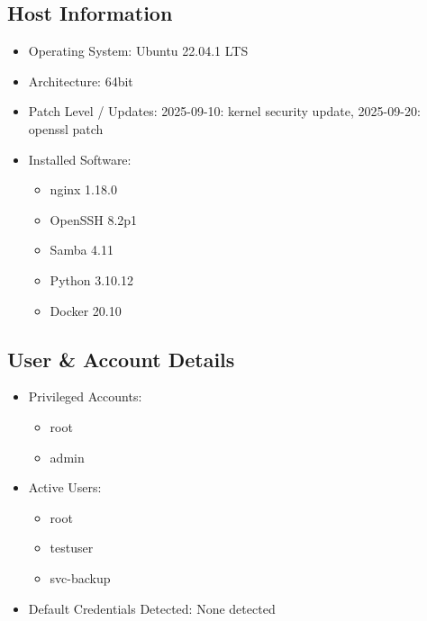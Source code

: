 \documentclass[a4paper,12pt]{article}
\begin{document}
\subsection*{Host Information}
\begin{itemize}
    \item Operating System: Ubuntu 22.04.1 LTS
    \item Architecture: 64bit
    \item Patch Level / Updates: 2025-09-10: kernel security update, 2025-09-20: openssl patch
    \item Installed Software: 
    \begin{itemize}
    
        \item nginx 1.18.0
    
        \item OpenSSH 8.2p1
    
        \item Samba 4.11
    
        \item Python 3.10.12
    
        \item Docker 20.10
    
    \end{itemize}
\end{itemize}

\subsection*{User \& Account Details}
\begin{itemize}
    \item Privileged Accounts: 
    \begin{itemize}
    
        \item root
    
        \item admin
    
    \end{itemize}
    \item Active Users:
    \begin{itemize}
    
        \item root
    
        \item testuser
    
        \item svc-backup
    
    \end{itemize}
    \item Default Credentials Detected: None detected
\end{itemize}
\end{document}
